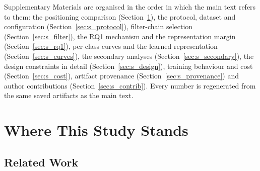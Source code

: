 \documentclass[journal]{IEEEtran}
\begin{document}

 Supplementary Materials are organised in the order in which the main text refers to them: the positioning comparison (Section~\ref{sec:s_positioning}), the protocol, dataset and configuration (Section~\ref{sec:s_protocol}), filter-chain selection (Section~\ref{sec:s_filter}), the RQ1 mechanism and the representation margin (Section~\ref{sec:s_rq1}), per-class curves and the learned representation (Section~\ref{sec:s_curves}), the secondary analyses (Section~\ref{sec:s_secondary}), the design constraints in detail (Section~\ref{sec:s_design}), training behaviour and cost (Section~\ref{sec:s_cost}), artifact provenance (Section~\ref{sec:s_provenance}) and author contributions (Section~\ref{sec:s_contrib}). Every number is regenerated from the same saved artifacts as the main text.

\section{Where This Study Stands}
\label{sec:s_positioning}

\subsection{Related Work}
\end{document}
